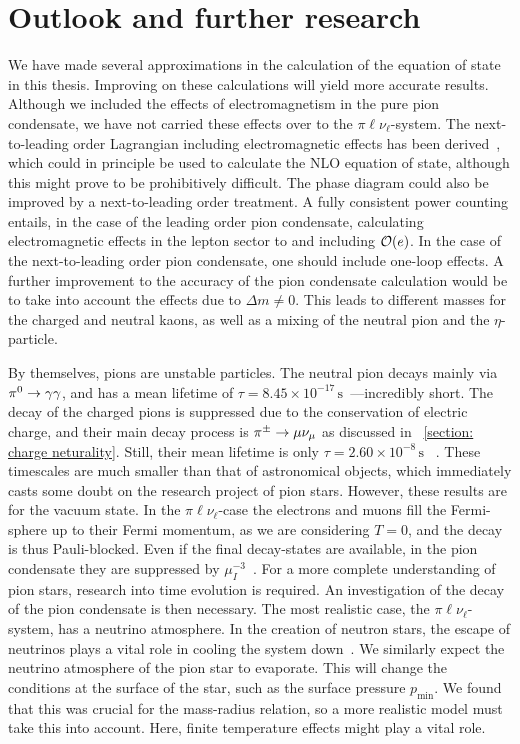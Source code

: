 \section{Outlook and further research}

We have made several approximations in the calculation of the equation of state in this thesis.
Improving on these calculations will yield more accurate results.
Although we included the effects of electromagnetism in the pure pion condensate, we have not carried these effects over to the $\pi\ell\nu_\ell$-system.
The next-to-leading order Lagrangian including electromagnetic effects has been derived~\autocite{urechVirtualPhotonsChiral1995}, which could in principle be used to calculate the NLO equation of state, although this might prove to be prohibitively difficult.
The phase diagram could also be improved by a next-to-leading order treatment.
A fully consistent power counting entails, in the case of the leading order pion condensate, calculating electromagnetic effects in the lepton sector to and including $\mathcal O(e)$.
In the case of the next-to-leading order pion condensate, one should include one-loop effects.
A further improvement to the accuracy of the pion condensate calculation would be to take into account the effects due to $\Delta m \neq 0$.
This leads to different masses for the charged and neutral kaons, as well as a mixing of the neutral pion and the $\eta$-particle.


By themselves, pions are unstable particles.
The neutral pion decays mainly via ${\pi^0}\rightarrow \gamma\gamma$, and has a mean lifetime of $\tau = 8.45\times 10^{-17}\,\text{s}$~\autocite{particledatagroupReviewParticlePhysics2020}---incredibly short.
The decay of the charged pions is suppressed due to the conservation of electric charge, and their main decay process is ${\pi^\pm}\rightarrow \mu \nu_\mu$ as discussed in
%
~\autoref{section: charge neturality}.
%
Still, their mean lifetime is only $\tau = 2.60\times 10^{-8}\,\text{s}$
%
~\autocite{particledatagroupReviewParticlePhysics2020}.
%
These timescales are much smaller than that of astronomical objects, which immediately casts some doubt on the research project of pion stars.
However, these results are for the vacuum state.
In the $\pi\ell\nu_\ell$-case the electrons and muons fill the Fermi-sphere up to their Fermi momentum, as we are considering $T = 0$, and the decay is thus Pauli-blocked.
Even if the final decay-states are available, in the pion condensate they are suppressed by $\mu_I^{-3}$~\autocite{brandtNewClassCompact2018}. 
For a more complete understanding of pion stars, research into time evolution is required.
An investigation of the decay of the pion condensate is then necessary.
The most realistic case, the $\pi\ell\nu_\ell$-system, has a neutrino atmosphere.
In the creation of neutron stars, the escape of neutrinos plays a vital role in cooling the system down~\autocite{glendenningCompactStarsNuclear2012}.
We similarly expect the neutrino atmosphere of the pion star to evaporate.
This will change the conditions at the surface of the star, such as the surface pressure $p_\text{min}$.
We found that this was crucial for the mass-radius relation, so a more realistic model must take this into account.
Here, finite temperature effects might play a vital role.


